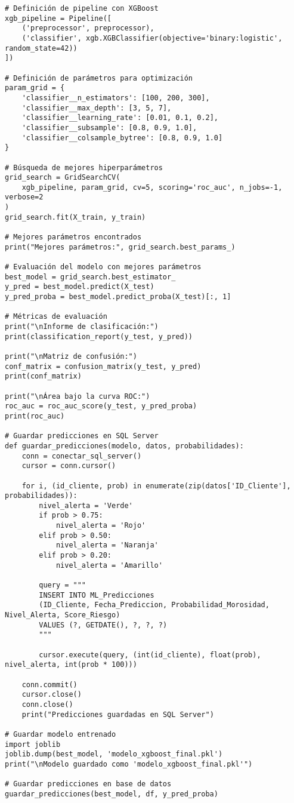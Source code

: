 \begin{verbatim}
# Definición de pipeline con XGBoost
xgb_pipeline = Pipeline([
    ('preprocessor', preprocessor),
    ('classifier', xgb.XGBClassifier(objective='binary:logistic', random_state=42))
])

# Definición de parámetros para optimización
param_grid = {
    'classifier__n_estimators': [100, 200, 300],
    'classifier__max_depth': [3, 5, 7],
    'classifier__learning_rate': [0.01, 0.1, 0.2],
    'classifier__subsample': [0.8, 0.9, 1.0],
    'classifier__colsample_bytree': [0.8, 0.9, 1.0]
}

# Búsqueda de mejores hiperparámetros
grid_search = GridSearchCV(
    xgb_pipeline, param_grid, cv=5, scoring='roc_auc', n_jobs=-1, verbose=2
)
grid_search.fit(X_train, y_train)

# Mejores parámetros encontrados
print("Mejores parámetros:", grid_search.best_params_)

# Evaluación del modelo con mejores parámetros
best_model = grid_search.best_estimator_
y_pred = best_model.predict(X_test)
y_pred_proba = best_model.predict_proba(X_test)[:, 1]

# Métricas de evaluación
print("\nInforme de clasificación:")
print(classification_report(y_test, y_pred))

print("\nMatriz de confusión:")
conf_matrix = confusion_matrix(y_test, y_pred)
print(conf_matrix)

print("\nÁrea bajo la curva ROC:")
roc_auc = roc_auc_score(y_test, y_pred_proba)
print(roc_auc)

# Guardar predicciones en SQL Server
def guardar_predicciones(modelo, datos, probabilidades):
    conn = conectar_sql_server()
    cursor = conn.cursor()
    
    for i, (id_cliente, prob) in enumerate(zip(datos['ID_Cliente'], probabilidades)):
        nivel_alerta = 'Verde'
        if prob > 0.75:
            nivel_alerta = 'Rojo'
        elif prob > 0.50:
            nivel_alerta = 'Naranja'
        elif prob > 0.20:
            nivel_alerta = 'Amarillo'
        
        query = """
        INSERT INTO ML_Predicciones 
        (ID_Cliente, Fecha_Prediccion, Probabilidad_Morosidad, Nivel_Alerta, Score_Riesgo)
        VALUES (?, GETDATE(), ?, ?, ?)
        """
        
        cursor.execute(query, (int(id_cliente), float(prob), nivel_alerta, int(prob * 100)))
    
    conn.commit()
    cursor.close()
    conn.close()
    print("Predicciones guardadas en SQL Server")

# Guardar modelo entrenado
import joblib
joblib.dump(best_model, 'modelo_xgboost_final.pkl')
print("\nModelo guardado como 'modelo_xgboost_final.pkl'")

# Guardar predicciones en base de datos
guardar_predicciones(best_model, df, y_pred_proba)
\end{verbatim}
\newpage
